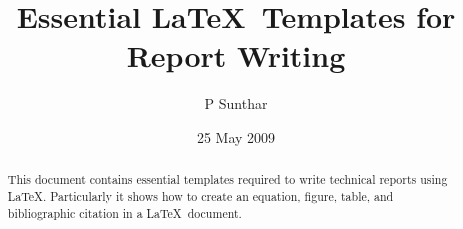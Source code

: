 \documentclass[11pt,a4paper,openright]{report}
\begin{document}
\title{Essential \LaTeX\ Templates for Report Writing}
\author{P Sunthar}
\date{25 May 2009}

\maketitle


\begin{abstract}
This document contains essential templates required to write technical
reports using \LaTeX.  Particularly it shows how to create an
equation, figure, table, and bibliographic citation in a \LaTeX\
document.
\end{abstract}

\tableofcontents

\listoftables
\listoffigures

\cleardoublepage
\setcounter{page}{1}








\end{document}
